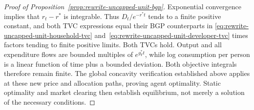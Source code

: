 \begin{proof}[Proof of Proposition~\ref{prop:rewrite-uncapped-unit-bgp}]
Exponential convergence implies that $r_t-r^*$ is integrable. Thus
$D_t/e^{-r^*t}$ tends to a finite positive constant, and both TVC expressions
equal their BGP counterparts in
\eqref{eq:rewrite-uncapped-unit-household-tvc}
and~\eqref{eq:rewrite-uncapped-unit-developer-tvc} times factors tending
to finite positive limits. Both TVCs hold. Output and all expenditure
flows are bounded multiples of $e^{g_Y^*t}$, while log consumption per
person is a linear function of time plus a bounded deviation. Both
objective integrals therefore remain finite. The global concavity
verification established above
applies at these new price and allocation paths, proving agent optimality.
Static optimality and market clearing then establish equilibrium, not
merely a solution of the necessary conditions.
\end{proof}

